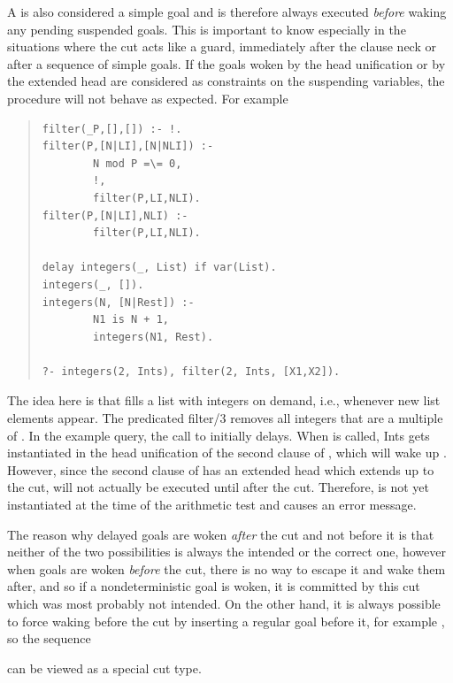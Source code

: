 A
is also considered a simple goal and is therefore
always executed \emph{before} waking any pending suspended goals.
This is important to know especially in the situations where the cut
acts like a guard, immediately after the clause neck or after
a sequence of simple goals.
If the goals woken by the head unification or by the extended head
are considered as constraints on the suspending variables,
the procedure will not behave as expected.
For example
\begin{quote}
\begin{verbatim}
filter(_P,[],[]) :- !.
filter(P,[N|LI],[N|NLI]) :-
        N mod P =\= 0,
        !,
        filter(P,LI,NLI).
filter(P,[N|LI],NLI) :-
        filter(P,LI,NLI).

delay integers(_, List) if var(List).
integers(_, []).
integers(N, [N|Rest]) :-
        N1 is N + 1,
        integers(N1, Rest).

?- integers(2, Ints), filter(2, Ints, [X1,X2]).
\end{verbatim}
\end{quote}
The idea here is that  fills a list with integers on
demand,
i.e., whenever new list elements appear.
The predicated {filter/3} removes all integers that are a multiple
of . In the example query, the call to  initially
delays.
When  is called, Ints gets instantiated in the head
unification
of the second clause of , which will wake up
. However,
since the second clause of  has an extended head which
extends up to
the cut,  will not actually be executed until after the
cut.
Therefore,  is not yet instantiated at the time of the arithmetic test
and causes an error message.

The reason why delayed goals are woken \emph{after} the cut and not before
it is that neither of the two possibilities is always the intended
or the correct one, however when goals are woken \emph{before} the cut,
there is no way to escape it and wake them after, and so if
a nondeterministic goal is woken, it is committed by this cut
which was most probably not intended.
On the other hand, it is always possible to force waking before the cut
by inserting a regular goal before it, for example
,
so the sequence
\begin{quote}
\end{quote}
can be viewed as a special cut type.

